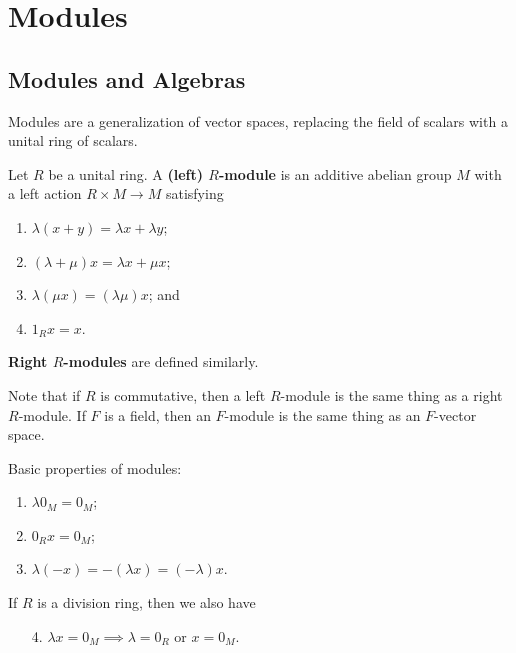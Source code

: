 \documentclass[twoside,10pt]{report}
\begin{document}
\tableofcontents


\chapter{Modules}

\section{Modules and Algebras}

Modules are a generalization of vector spaces, replacing the field of scalars with a unital ring of scalars.

\begin{defn}[]
	Let $R$ be a unital ring. A \textbf{(left) $R$-module} is an additive abelian group $M$ with a left action $R \times M \to  M$ satisfying
\begin{enumerate}
	\item $\lambda(x+y) = \lambda x + \lambda y$;
	\item $(\lambda + \mu)x = \lambda x + \mu x$;
	\item $\lambda(\mu x) = (\lambda \mu)x$; and
	\item $1_{R}x = x$.
\end{enumerate}
\textbf{Right $R$-modules} are defined similarly.
\end{defn}

Note that if $R$ is commutative, then {\color{red}a left $R$-module is the same thing as a right $R $-module.} If $F$ is a field, then an $F$-module is the same thing as an $F$-vector space.

\begin{prop}
Basic properties of modules:
\begin{enumerate}
	\item $\lambda 0_{M} = 0_{M}$;
	\item $0_{R}x = 0_{M}$;
	\item $\lambda(-x) = -(\lambda x) = (-\lambda) x$.
\end{enumerate}
If $R$ is a division ring, then we also have
\begin{enumerate}
	\item[4.] $\lambda x = 0_{M} \implies \lambda=0_{R}$ or $x = 0_{M}$.
\end{enumerate}
\end{prop}
\end{document}
